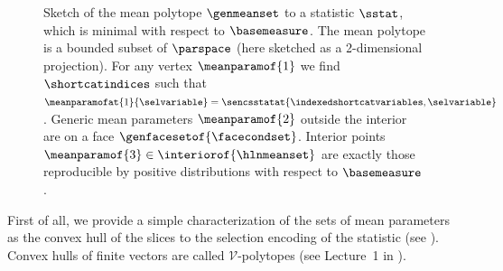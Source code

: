 \begin{figure}[t]
    \begin{center}
        
    \end{center}
    \caption{Sketch of the mean polytope ${\genmeanset}$ to a statistic $\sstat$, which is minimal with respect to $\basemeasure$.
    The mean polytope is a bounded subset of $\parspace$ (here sketched as a 2-dimensional projection). %
    For any vertex $\meanparamof{1}$ we find $\shortcatindices$ such that $\meanparamofat{1}{\selvariable}=\sencsstatat{\indexedshortcatvariables,\selvariable}$.
    Generic mean parameters $\meanparamof{2}$ outside the interior are on a face $\genfacesetof{\facecondset}$. %
    Interior points $\meanparamof{3}\in\interiorof{\hlnmeanset}$ are exactly those reproducible by positive distributions with respect to $\basemeasure$.  %
    }\label{fig:meansetSketchGeneric}
\end{figure}

First of all, we provide a simple characterization of the sets of mean parameters as the convex hull of the slices to the selection encoding of the statistic (see ).
Convex hulls of finite vectors are called $\mathcal{V}$-polytopes (see Lecture~1 in \cite{ziegler_lectures_2013}).

